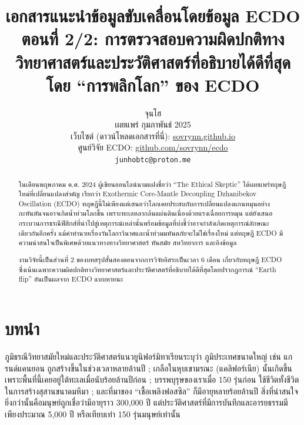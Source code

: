 \documentclass[10pt,twocolumn,letterpaper]{article}
\begin{document}
\title{เอกสารแนะนำข้อมูลขับเคลื่อนโดยข้อมูล ECDO ตอนที่ 2/2: การตรวจสอบความผิดปกติทางวิทยาศาสตร์และประวัติศาสตร์ที่อธิบายได้ดีที่สุดโดย “การพลิกโลก” ของ ECDO}

\author{จุนโฮ\\
เผยแพร่ กุมภาพันธ์ 2025\\
เว็บไซต์ (ดาวน์โหลดเอกสารที่นี่): \href{https://sovrynn.github.io}{sovrynn.github.io}\\
ศูนย์วิจัย ECDO: \href{https://github.com/sovrynn/ecdo}{github.com/sovrynn/ecdo}\\
{\tt\small junhobtc@proton.me}
}

\maketitle

\begin{abstract}
ในเดือนพฤษภาคม ค.ศ. 2024 ผู้เขียนออนไลน์นามแฝงชื่อว่า “The Ethical Skeptic” \cite{0} ได้เผยแพร่ทฤษฎีใหม่ที่เปลี่ยนแปลงสำคัญ เรียกว่า Exothermic Core-Mantle Decoupling Dzhanibekov Oscillation (ECDO) \cite{1} ทฤษฎีนี้ไม่เพียงแต่เสนอว่าโลกเคยประสบกับการเปลี่ยนแปลงแกนหมุนอย่างกะทันหันจนอาจเกิดน้ำท่วมโลกขึ้น เพราะทะเลหลากล้นแผ่นดินเนื่องด้วยแรงเฉื่อยการหมุน แต่ยังเสนอกระบวนการธรณีฟิสิกส์ที่นำไปสู่เหตุการณ์เหล่านั้นพร้อมข้อมูลที่บ่งชี้ว่าอาจกำลังเกิดเหตุการณ์ลักษณะเดียวกันอีกครั้ง แม้คำทำนายเรื่องวันโลกาวินาศและน้ำท่วมมหันตภัยจะไม่ใช่เรื่องใหม่ แต่ทฤษฎี ECDO มีความน่าสนใจเป็นพิเศษด้วยแนวทางทางวิทยาศาสตร์ ทันสมัย สหวิทยาการ และอิงข้อมูล

งานวิจัยนี้เป็นส่วนที่ 2 ของบทสรุปสั้นสองตอนจากการวิจัยอิสระเป็นเวลา 6 เดือน \cite{2,20} เกี่ยวกับทฤษฎี ECDO ซึ่งเน้นเฉพาะความผิดปกติทางวิทยาศาสตร์และประวัติศาสตร์ที่อธิบายได้ดีที่สุดโดยปรากฏการณ์ “Earth flip” อันเป็นผลจาก ECDO แบบหายนะ

\end{abstract}

\section{บทนำ}

ภูมิธรณีวิทยาสมัยใหม่และประวัติศาสตร์แนวยูนิฟอร์มิทาเรียนระบุว่า ภูมิประเทศขนาดใหญ่ เช่น แกรนด์แคนยอน ถูกสร้างขึ้นในช่วงเวลาหลายล้านปี \cite{143}; เกลือในหุบเขามรณะ (แคลิฟอร์เนีย) นั้นเกิดขึ้นเพราะพื้นที่นี้เคยอยู่ใต้ทะเลเมื่อนับร้อยล้านปีก่อน \cite{144}; บรรพบุรุษของเราเมื่อ 150 รุ่นก่อน ใช้ชีวิตทั้งชีวิตในการสร้างสุสานขนาดมหึมา \cite{29,70}; และที่มาของ “เชื้อเพลิงฟอสซิล” ก็มีอายุหลายร้อยล้านปี \cite{104} สิ่งที่น่าสนใจยิ่งกว่านั้นคือมนุษย์ถูกเชื่อว่ามีอายุราว 300,000 ปี \cite{145} แต่ประวัติศาสตร์ที่มีการบันทึกและอารยธรรมมีเพียงประมาณ 5,000 ปี หรือเทียบเท่า 150 รุ่นมนุษย์เท่านั้น
\end{document}
